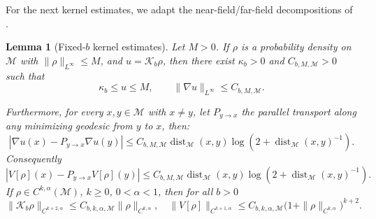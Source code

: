 \documentclass[11pt]{article}
\newtheorem{lemma}[theorem]{Lemma}
\theoremstyle{definition}
\def\K{\mathcal K}
\def\Kb{\mathcal K_b}
\def\M{\mathcal M}
\begin{document}
For the next kernel estimates, we adapt the near-field/far-field decompositions of \cite[Appendix A]{chizat2026quantitative_kmd}.

\begin{lemma}[Fixed-\(b\) kernel estimates]\label{lem:wellposed_kernel_estimates}
Let \(M>0\). If \(\rho\) is a probability density on  \(\M\) with
\(\|\rho\|_{L^\infty}\le M\), and \(u=\Kb\rho\), then there exist $\kappa_b>0$ and $C_{b,M,\M}>0$ such that
\begin{equation}\label{eq:wellposed_fixed_b_basic}
\kappa_b\le u\le M,\qquad \|\nabla u\|_{L^\infty}\le C_{b,M,\M}.
\end{equation}

Furthermore, for every $x,y\in \M$ with $x\neq y$, let \(P_{y\to x}\) the parallel
transport along any minimizing geodesic from \(y\) to \(x\), then:
\[
|\nabla u(x)-P_{y\to x}\nabla u(y)|
\le C_{b,M,\M}\operatorname{dist}_{ \M}(x,y)\log(2+\operatorname{dist}_{ \M}(x,y)^{-1}).
\]
Consequently
\[
|V[\rho](x)-P_{y\to x}V[\rho](y)|
\le C_{b,M,\M}\operatorname{dist}_{ \M}(x,y)\log(2+\operatorname{dist}_{ \M}(x,y)^{-1}).
\]
If \(\rho\in C^{k,\alpha}( \M)\), \(k\ge0\), \(0<\alpha<1\), then for all $b>0$
\begin{equation}
\label{eq:schauder}
\|\K_b\rho\|_{C^{k+2,\alpha}}
\le C_{b,k,\alpha,\M}\|\rho\|_{C^{k,\alpha}},
\quad
\|V[\rho]\|_{C^{k+1,\alpha}}
\le C_{b,k,\alpha,\M}\bigl(1+\|\rho\|_{C^{k,\alpha}}\bigr)^{k+2}.
\end{equation}
\end{lemma}
\end{document}

